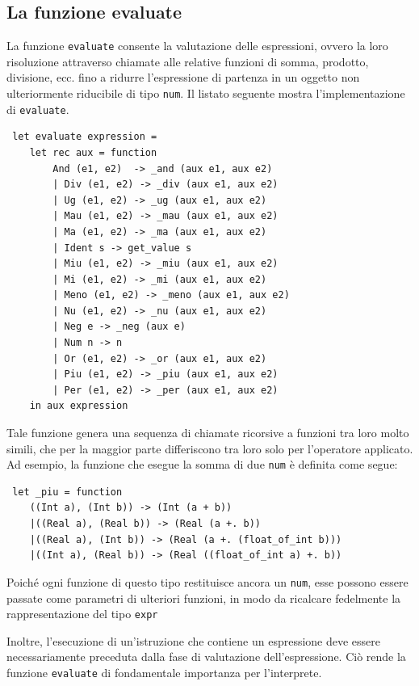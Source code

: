 \documentclass[a4paper,10pt]{article}
\begin{document}
\subsection{La funzione evaluate}
La funzione \texttt{evaluate} consente la valutazione delle espressioni, ovvero
la loro risoluzione attraverso chiamate alle relative funzioni di somma,
prodotto, divisione, ecc. fino a ridurre l'espressione di partenza in un oggetto
non ulteriormente riducibile di tipo \texttt{num}. Il listato
seguente mostra l'implementazione di \texttt{evaluate}.
\begin{verbatim}
 let evaluate expression =  
    let rec aux = function
        And (e1, e2)  -> _and (aux e1, aux e2)
        | Div (e1, e2) -> _div (aux e1, aux e2)
        | Ug (e1, e2) -> _ug (aux e1, aux e2)
        | Mau (e1, e2) -> _mau (aux e1, aux e2)
        | Ma (e1, e2) -> _ma (aux e1, aux e2)
        | Ident s -> get_value s
        | Miu (e1, e2) -> _miu (aux e1, aux e2)
        | Mi (e1, e2) -> _mi (aux e1, aux e2)
        | Meno (e1, e2) -> _meno (aux e1, aux e2)
        | Nu (e1, e2) -> _nu (aux e1, aux e2)
        | Neg e -> _neg (aux e)
        | Num n -> n
        | Or (e1, e2) -> _or (aux e1, aux e2)
        | Piu (e1, e2) -> _piu (aux e1, aux e2)
        | Per (e1, e2) -> _per (aux e1, aux e2)
    in aux expression
\end{verbatim}
Tale funzione genera una sequenza di chiamate ricorsive a funzioni tra
loro molto simili, che per la maggior parte differiscono tra loro solo
per l'operatore applicato. Ad esempio, la funzione che esegue la somma di
 due \texttt{num} \`e definita come segue:
\begin{verbatim}
 let _piu = function
    ((Int a), (Int b)) -> (Int (a + b))
    |((Real a), (Real b)) -> (Real (a +. b))
    |((Real a), (Int b)) -> (Real (a +. (float_of_int b)))
    |((Int a), (Real b)) -> (Real ((float_of_int a) +. b))
\end{verbatim}
Poich\'e ogni funzione di questo tipo restituisce ancora un \texttt{num}, esse
possono essere passate come parametri di ulteriori funzioni, in modo da
ricalcare fedelmente la rappresentazione del tipo \texttt{expr}

Inoltre, l'esecuzione di un'istruzione che contiene un espressione deve essere
necessariamente preceduta dalla fase di valutazione dell'espressione. Ci\`o
rende la funzione \texttt{evaluate} di fondamentale importanza per l'interprete.
\end{document}
